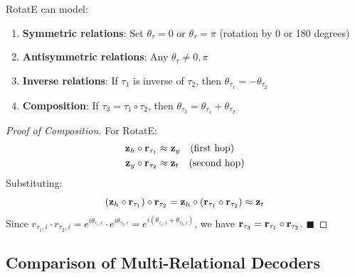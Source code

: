\begin{notechapter}
\begin{proposition}
RotatE can model:
\begin{enumerate}
    \item \textbf{Symmetric relations}: Set $\theta_\tau = 0$ or $\theta_\tau = \pi$ (rotation by 0 or 180 degrees)
    \item \textbf{Antisymmetric relations}: Any $\theta_\tau \neq 0, \pi$
    \item \textbf{Inverse relations}: If $\tau_1$ is inverse of $\tau_2$, then $\theta_{\tau_1} = -\theta_{\tau_2}$
    \item \textbf{Composition}: If $\tau_3 = \tau_1 \circ \tau_2$, then $\theta_{\tau_3} = \theta_{\tau_1} + \theta_{\tau_2}$
\end{enumerate}
\end{proposition}

\begin{proof}[Proof of Composition]
For RotatE:
\begin{align*}
\mathbf{z}_h \circ \mathbf{r}_{\tau_1} &\approx \mathbf{z}_y \quad \text{(first hop)} \\
\mathbf{z}_y \circ \mathbf{r}_{\tau_2} &\approx \mathbf{z}_t \quad \text{(second hop)}
\end{align*}
Substituting:
\[
(\mathbf{z}_h \circ \mathbf{r}_{\tau_1}) \circ \mathbf{r}_{\tau_2} = \mathbf{z}_h \circ (\mathbf{r}_{\tau_1} \circ \mathbf{r}_{\tau_2}) \approx \mathbf{z}_t
\]
Since $r_{\tau_1,i} \cdot r_{\tau_2,i} = e^{i\theta_{\tau_1,i}} \cdot e^{i\theta_{\tau_2,i}} = e^{i(\theta_{\tau_1,i} + \theta_{\tau_2,i})}$, we have $\mathbf{r}_{\tau_3} = \mathbf{r}_{\tau_1} \circ \mathbf{r}_{\tau_2}$. $\blacksquare$
\end{proof}

\subsection{Comparison of Multi-Relational Decoders}


\end{notechapter}
